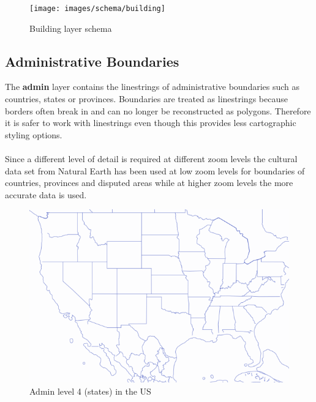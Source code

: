 \begin{figure}[H]
  \centering
  \texttt{[image: images/schema/building]}
  \caption{Building layer schema}
\end{figure}

\subsection{Administrative Boundaries}

\noindent\begin{minipage}[t]{0.48\linewidth}
    \vspace{0pt}
    The \textbf{admin} layer contains the linestrings of administrative boundaries such as countries, states or provinces.
    Boundaries are treated as linestrings because borders often break in \osm{} and can no longer be reconstructed as polygons. Therefore it is safer to work with linestrings even though this provides less cartographic styling options.
    \\\\
    Since a different level of detail is required at different zoom levels the cultural data set from  Natural Earth \cite{16_naturalearthdata.com_2015} has been used at low zoom levels for boundaries of countries, provinces and disputed areas while at higher zoom levels the more accurate \osm{} data is used.
\end{minipage}
\hfill
\begin{minipage}[t]{0.48\linewidth}
    \vspace{-20pt}
    \begin{figure}[H]
      \includegraphics[width=1\textwidth]{images/schema/admin_example}
      \caption{Admin level 4 (states) in the US}
    \end{figure}
\end{minipage}


